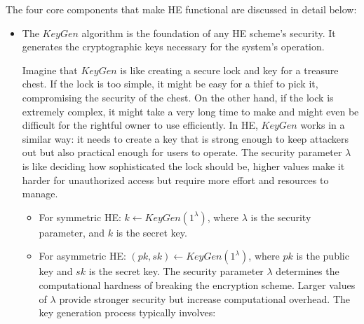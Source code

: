\documentclass[
  letterpaper,
  DIV=11,
  numbers=noendperiod,
  oneside]{scrartcl}
\begin{document}
The four core components that make HE functional are discussed in detail
below:

\begin{itemize}
\item
  The \(KeyGen\) algorithm is the foundation of any HE scheme's
  security. It generates the cryptographic keys necessary for the
  system's operation.

  Imagine that \(KeyGen\) is like creating a secure lock and key for a
  treasure chest. If the lock is too simple, it might be easy for a
  thief to pick it, compromising the security of the chest. On the other
  hand, if the lock is extremely complex, it might take a very long time
  to make and might even be difficult for the rightful owner to use
  efficiently. In HE, \(KeyGen\) works in a similar way: it needs to
  create a key that is strong enough to keep attackers out but also
  practical enough for users to operate. The security parameter
  \(\lambda\) is like deciding how sophisticated the lock should be,
  higher values make it harder for unauthorized access but require more
  effort and resources to manage.

  \begin{itemize}
  \item
    For symmetric HE: \(k \leftarrow KeyGen(1^\lambda)\), where
    \(\lambda\) is the security parameter, and \(k\) is the secret key.
  \item
    For asymmetric HE: \((pk, sk) \leftarrow KeyGen(1^\lambda)\), where
    \(pk\) is the public key and \(sk\) is the secret key. The security
    parameter \(\lambda\) determines the computational hardness of
    breaking the encryption scheme. Larger values of \(\lambda\) provide
    stronger security but increase computational overhead. The key
    generation process typically involves:


\end{itemize}
\end{itemize}
\end{document}
